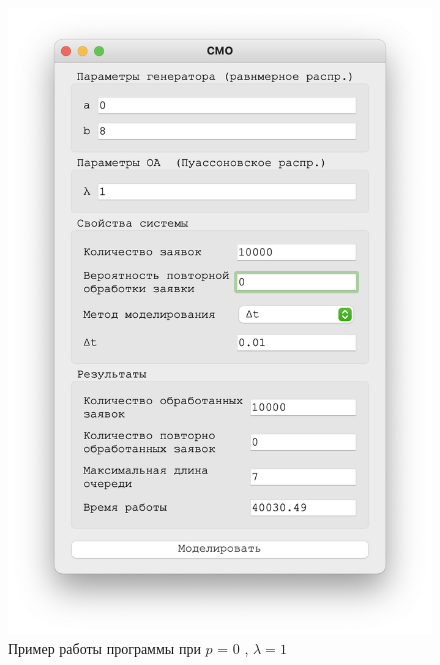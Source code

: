 \begin{figure}[!htb]
\begin{minipage}{0.55\textwidth}
    \end{minipage}\hfill
    \begin{minipage}{0.55\textwidth}
      \centering
      \includegraphics[width=1\linewidth]{1-0-t}
    \end{minipage}
    \caption{Пример работы программы при $p$ = 0 , $\lambda = 1$}
 \end{figure}



